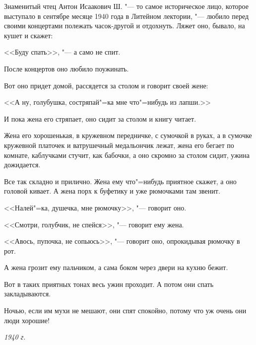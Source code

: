 Знаменитый чтец Антон Исаакович Ш. "--- то самое историческое лицо, которое выступало в сентябре месяце 1940 года в Литейном лектории, "--- любило перед своими концертами полежать часок-другой и отдохнуть. Ляжет оно, бывало, на кушет и скажет:

<<Буду спать>>, "--- а само не спит.

После концертов оно любило поужинать.

Вот оно придет домой, рассядется за столом и говорит своей жене:

<<А ну, голубушка, состряпай"=ка мне что"=нибудь из лапши.>>

И пока жена его стряпает, оно сидит за столом и книгу читает.

Жена его хорошенькая, в кружевном передничке, с сумочкой в руках, а в сумочке кружевной платочек и ватрушечный медальончик лежат, жена его бегает по комнате, каблучками стучит, как бабочки, а оно скромно за столом сидит, ужина дожидается.

Все так складно и прилично. Жена ему что"=нибудь приятное скажет, а оно головой кивает. А жена порх к буфетику и уже рюмочками там звенит.

<<Налей"=ка, душечка, мне рюмочку>>, "--- говорит оно.

<<Смотри, голубчик, не спейся>>, "--- говорит ему жена.

<<Авось, пупочка, не сопьюсь>>, "--- говорит оно, опрокидывая рюмочку в рот.

А жена грозит ему пальчиком, а сама боком через двери на кухню бежит.

Вот в таких приятных тонах весь ужин проходит. А потом они спать закладываются.

Ночью, если им мухи не мешают, они спят спокойно, потому что уж очень они люди хорошие!

\medskip
\noindent\textit{1940 г.}
